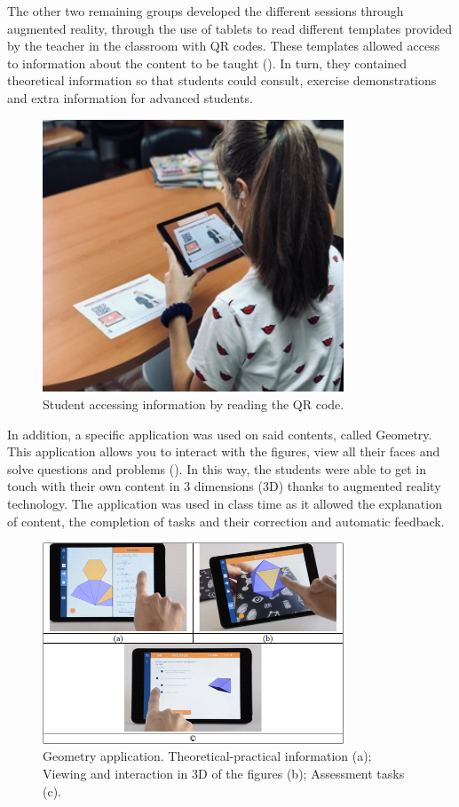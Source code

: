 \documentclass[english]{textolivre}
\begin{document}
The other two remaining groups developed the different sessions through augmented reality, through the use of tablets to read different templates provided by the teacher in the classroom with QR codes. These templates allowed access to information about the content to be taught (). In turn, they contained theoretical information so that students could consult, exercise demonstrations and extra information for advanced students.

\begin{figure}[htbp]
 \centering
 \includegraphics[width=0.8\textwidth]{fig-002.jpg}
 \caption{Student accessing information by reading the QR code.}
 \label{fig2}
\end{figure}

In addition, a specific application was used on said contents, called Geometry. This application allows you to interact with the figures, view all their faces and solve questions and problems (). In this way, the students were able to get in touch with their own content in 3 dimensions (3D) thanks to augmented reality technology. The application was used in class time as it allowed the explanation of content, the completion of tasks and their correction and automatic feedback.

\begin{figure}[htbp]
 \centering
 \includegraphics[width=0.8\textwidth]{fig3.png}
 \caption{Geometry application. Theoretical-practical information (a); Viewing and interaction in 3D of the figures (b); Assessment tasks (c).}
 \label{fig3}
\end{figure}
\end{document}

